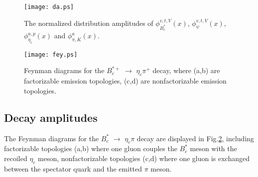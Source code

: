 \documentclass[preprint,superscriptaddress,nofootinbib]{revtex4}
\begin{document}
  \begin{figure}[h]
  \texttt{[image: da.ps]}
  \caption{The normalized distribution amplitudes of
  ${\phi}_{B_{c}^{\ast}}^{v,t,V}(x)$, ${\phi}_{\psi}^{v,t,V}(x)$,
  ${\phi}_{{\eta}_{c}}^{a,p}(x)$ and ${\phi}_{{\pi},K}^{a}(x)$.}
  \label{fig:da}
  \end{figure}
  \begin{figure}[h]
  \texttt{[image: fey.ps]}
  \caption{Feynman diagrams for the $B_{c}^{{\ast}+}$ ${\to}$
  ${\eta}_{c}{\pi}^{+}$ decay, where (a,b) are factorizable
  emission topologies, (c,d) are nonfactorizable emission
  topologies.}
  \label{feynman}
  \end{figure}

  \subsection{Decay amplitudes}
  \label{sec0205}
  The Feynman diagrams for the $B_{c}^{{\ast}}$ ${\to}$ ${\eta}_{c}{\pi}$ decay
  are displayed in Fig.\ref{feynman}, including factorizable topologies
  (a,b) where one gluon couples the $B_{c}^{{\ast}}$ meson with
  the recoiled ${\eta}_{c}$ meson, nonfactorizable topologies (c,d) where
  one gluon is exchanged between the spectator quark and the emitted ${\pi}$
  meson.
\end{document}
